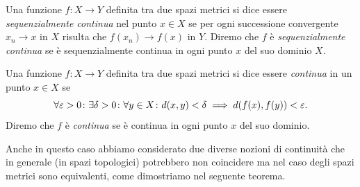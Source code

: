 \begin{definition}[continuità]%
  \label{def:continua_metrico}%
\mymark{**}%
Una funzione $f\colon X \to Y$ definita tra due spazi metrici
si dice essere \emph{sequenzialmente continua}%
 nel punto $x\in X$ se
per ogni successione convergente $x_n \to x$ in $X$ 
risulta che $f(x_n)\to f(x)$ in $Y$.
Diremo che $f$ è \emph{sequenzialmente continua} se è sequenzialmente continua
in ogni punto $x$ del suo dominio $X$.

Una funzione $f\colon X \to Y$ definita tra due spazi metrici
si dice essere \emph{continua}%
 in un punto $x\in X$ se
\begin{equation}\label{eq:continuita_metrico}
 \forall \varepsilon>0\colon \exists \delta>0\colon \forall y \in X \colon
 d(x,y)< \delta \implies d(f(x), f(y)) < \varepsilon.
\end{equation}
Diremo che $f$ è \emph{continua} se
è continua in ogni punto $x$ del suo dominio.
\end{definition}

Anche in questo caso abbiamo considerato due diverse nozioni di continuità che
in generale (in spazi topologici) potrebbero non coincidere ma nel caso degli
spazi metrici sono equivalenti, come dimostriamo nel seguente teorema.

